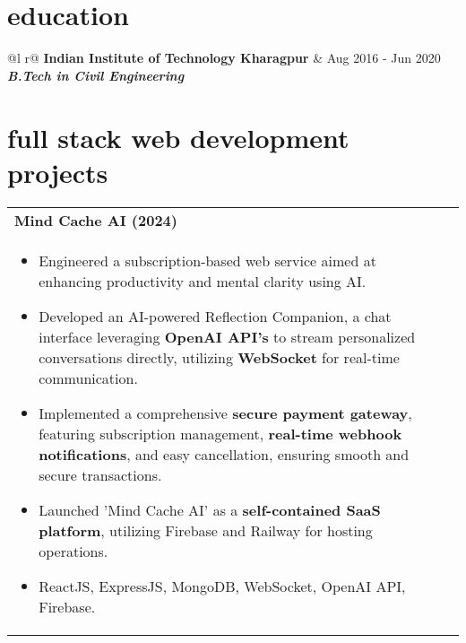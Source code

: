 \documentclass[a4paper,8pt]{article}
\begin{document}
\vspace{4 pt}

\section{education}
\begin{tabularx}{\linewidth}{ @{}l r@{} }
\color[HTML]{1C033C} \textbf{Indian Institute of Technology Kharagpur} & \hfill \color[HTML]{371e77} Aug 2016 - Jun 2020 \\[2pt]
\color[HTML]{371e77}\textbf{\textit{B.Tech in Civil Engineering}} \color[HTML]{4B28A4} \\[5pt]
\end{tabularx}

\vspace{-8pt}

\section{full stack web development projects}
\begin{tabularx}{\linewidth}{ @{}l r@{} }
\textbf{{Mind Cache AI (2024)}} \hfill \color[HTML]{371e77} \\[1pt]
\begin{minipage}[t]{\linewidth}
    \begin{itemize}[nosep,after=\strut, leftmargin=2em, itemsep=2pt]
        \item Engineered a subscription-based web service aimed at enhancing productivity and mental clarity using AI.
        \item Developed an AI-powered Reflection Companion, a chat interface leveraging \textbf{OpenAI API's} to stream personalized conversations directly, utilizing \textbf{WebSocket} for real-time communication.
        \item Implemented a comprehensive \textbf{secure payment gateway}, featuring subscription management, \textbf{real-time webhook notifications}, and easy cancellation, ensuring smooth and secure transactions.
        \item Launched 'Mind Cache AI' as a \textbf{self-contained SaaS platform}, utilizing Firebase and Railway for hosting operations.
        \item ReactJS, ExpressJS, MongoDB, WebSocket, OpenAI API, Firebase.
    \end{itemize}
\end{minipage}
\end{tabularx}
\end{document}
